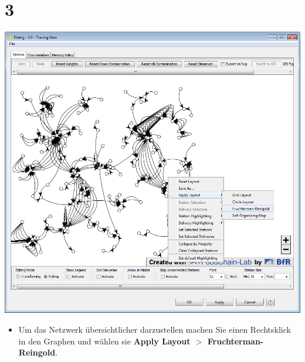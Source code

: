 \documentclass{beamer}
\begin{document}
\section{3}
\begin{frame}
	\begin{center}
  		\includegraphics[height=0.6\textheight]{3.png}
	\end{center}
	\begin{itemize}
		\item Um das Netzwerk übersichtlicher darzustellen machen Sie einen Rechtsklick in den Graphen und wählen sie \textbf{Apply Layout $>$ Fruchterman-Reingold}.
	\end{itemize}
\end{frame}
\end{document}
